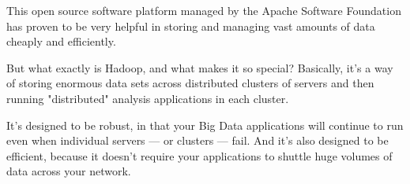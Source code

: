 \documentclass{beamer}
\begin{document}
\begin{frame}
This open source software platform managed by the Apache Software Foundation has proven to be very helpful in storing and managing vast amounts of data cheaply and efficiently.

But what exactly is Hadoop, and what makes it so special? Basically, it's a way of storing enormous data sets across distributed clusters of servers and then running "distributed" analysis applications in each cluster.

It's designed to be robust, in that your Big Data applications will continue to run even when individual servers — or clusters — fail. And it's also designed to be efficient, because it doesn't require your applications to shuttle huge volumes of data across your network.
\end{frame}
\end{document}
